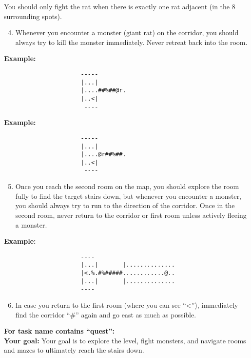 \begin{MyGreenBox}[frametitle={\textbf{Iteration 2 MiniHack Prompt}}]
You should only fight the rat when there is exactly one rat adjacent (in the 8 surrounding spots).

\begin{enumerate}\setcounter{enumi}{3}
  \item Whenever you encounter a monster (giant rat) on the corridor, you should always try to kill the monster immediately. Never retreat back into the room.
\end{enumerate}

\textbf{Example:}
\begin{verbatim}
                      -----
                      |...|
                      |....##%##@r.
                      |..<|
                       ----
\end{verbatim}

\textbf{Example:}
\begin{verbatim}
                      -----
                      |...|
                      |....@r##%##.
                      |..<|
                       ----
\end{verbatim}

\begin{enumerate}\setcounter{enumi}{4}
  \item Once you reach the second room on the map, you should explore the room fully to find the target stairs down, but whenever you encounter a monster, you should always try to run to the direction of the corridor. Once in the second room, never return to the corridor or first room unless actively fleeing a monster.
\end{enumerate}

\textbf{Example:}
\begin{verbatim}
                      ----
                      |...|       |..............
                      |<.%.#%#####............@..
                      |...|       |..............
                      ----
\end{verbatim}

\begin{enumerate}\setcounter{enumi}{5}
  \item In case you return to the first room (where you can see “<”), immediately find the corridor “\#” again and go east as much as possible.
\end{enumerate}


\textbf{For task name contains “quest”:}\\
\textbf{Your goal:} Your goal is to explore the level, fight monsters, and navigate rooms and mazes to ultimately reach the stairs down.


\end{MyGreenBox}
